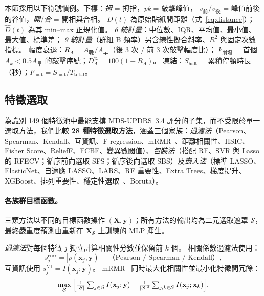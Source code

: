 \documentclass[12pt, a4paper]{article}
\begin{document}
本節採用以下符號慣例。下標：\emph{拇} = 拇指，\emph{pk} = 敲擊峰值，
$v_\text{前}$/$v_\text{後}$ = 峰值前後的谷值，\emph{開}/\emph{合} = 開相與合相。
$D(t)$ 為原始貼紙間距離（式~\ref{eq:distance}）；$\hat{D}(t)$ 為其 min--max 正規化值。
\emph{6 統計量}：中位數、IQR、平均值、最小值、最大值、標準差；
\emph{9 統計量}（群組 B 頻率）另含線性擬合斜率、$R^2$ 與固定次數指標。
幅度衰退：$R_A = A_\text{晚}/A_\text{早}$（後 3 次 / 前 3 次敲擊幅度比）；
$k_\text{崩塌}$ = 首個 $A_k < 0.5A_\text{早}$ 的敲擊序號；$D_A^{\%} = 100(1-R_A)$。
凍結：$S_\text{halt}$ = 累積停頓時長（秒）；$F_\text{halt} = S_\text{halt}/T_\text{total}$。

\subsection{特徵選取}

\begin{sloppypar}
為識別 149 個特徵池中最能支撐 MDS-UPDRS~3.4 評分的子集，而不受限於單一選取方法，我們比較 \textbf{28 種特徵選取方法}，涵蓋三個家族：\emph{過濾法}（Pearson、Spearman、Kendall、互資訊、F-regression、mRMR~\cite{Peng2005}、距離相關性、HSIC、Fisher Score、ReliefF、FCBF、變異數閾值）、\emph{包裝法}（搭配 RF、SVR 與 Lasso 的 RFECV；循序前向選取 SFS；循序後向選取 SBS）及\emph{嵌入法}（標準 LASSO、ElasticNet、自適應 LASSO、LARS、RF 重要性、Extra Trees、梯度提升、XGBoost、排列重要性、穩定性選取~\cite{Meinshausen2009}、Boruta）。
\end{sloppypar}

\paragraph{各族群目標函數。}
三類方法以不同的目標函數操作 $(\mathbf{X}, \mathbf{y})$；所有方法的輸出均為二元選取遮罩
$\mathcal{S}$，最終嚴重度預測由重新在 $\mathbf{X}_{\mathcal{S}}$ 上訓練的 MLP 產生。

\emph{過濾法}對每個特徵 $j$ 獨立計算相關性分數並保留前 $k$ 個。
相關係數過濾法使用：
\begin{equation}
    s_j^{\mathrm{corr}} = |\rho(\mathbf{x}_j, \mathbf{y})|
    \quad\text{（Pearson / Spearman / Kendall）},
    \label{eq:filter_corr}
\end{equation}
互資訊使用 $s_j^{\mathrm{MI}} = I(\mathbf{x}_j;\mathbf{y})$。
mRMR~\cite{Peng2005} 同時最大化相關性並最小化特徵間冗餘：
\begin{equation}
    \max_{\mathcal{S}}\;\Bigl[
        \tfrac{1}{|\mathcal{S}|}\textstyle\sum_{j\in\mathcal{S}} I(\mathbf{x}_j;\mathbf{y})
        -
        \tfrac{1}{|\mathcal{S}|^2}\textstyle\sum_{j,k\in\mathcal{S}} I(\mathbf{x}_j;\mathbf{x}_k)
    \Bigr].
    \label{eq:mrmr}
\end{equation}
\end{document}
